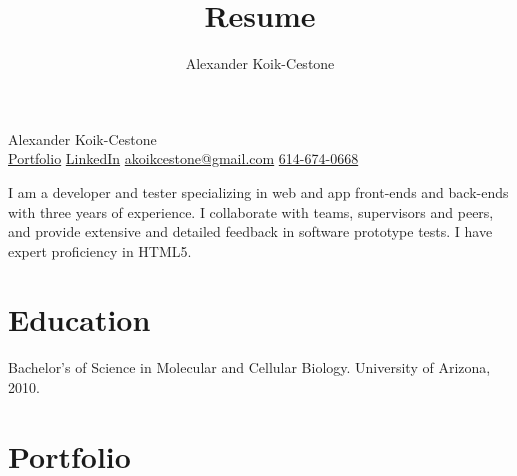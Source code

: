 \documentclass{article}
\author{Alexander Koik-Cestone}
\title{Resume}
\begin{document}
\begin{center}
{\huge Alexander Koik-Cestone\vspace{0.3cm}} \\
\href{https://sirkoik.github.io#portfolio}{Portfolio}
\textcolor{gray}{\textbullet}
\href{https://www.linkedin.com/in/alexander-koik-cestone-89304556/}{LinkedIn}
\textcolor{gray}{\textbullet}
\href{mailto:akoikcestone@gmail.com}{akoikcestone@gmail.com}
\textcolor{gray}{\textbullet}
\href{tel:614-674-0668}{614-674-0668} \\
\end{center}

\noindent
I am a developer and tester specializing in web and app front-ends and back-ends with three years of experience. I collaborate with teams, supervisors and peers, and provide extensive and detailed feedback in software prototype tests. I have expert proficiency in HTML5.

\section*{Education}\vspace{-0.5em}
Bachelor's of Science in Molecular and Cellular Biology. University of Arizona, 2010.

\vspace{-0.5em}
\section*{Portfolio}\vspace{-0.5em}
\end{document}
